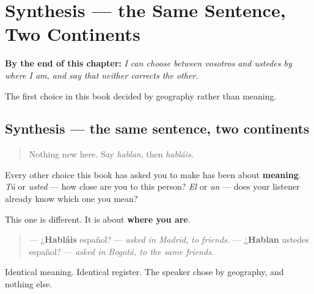 
\chapter{Synthesis --- the Same Sentence, Two Continents}
\label{ch:spanish-synthesis-plural-you}

\begin{chapteropening}
\textbf{By the end of this chapter:} \emph{I can choose between vosotros and ustedes by where I am, and say that neither corrects the other.}

The first choice in this book decided by geography rather than meaning.
\end{chapteropening}

\section[Practice]{Synthesis — the same sentence, two continents}

\label{lesson:ES-C07-sintesis-dos-continentes}



\begin{quote}
Nothing new here. Say \emph{hablan}, then \emph{habláis}.
\end{quote}

\begin{grammarlens}[title={Grammar Lens: a choice that is not about grammar}]
Every other choice this book has asked you to make has been about \textbf{meaning}. \emph{Tú} or \emph{usted} — how close are you to this person? \emph{El} or \emph{un} — does your listener already know which one you mean?

This one is different. It is about \textbf{where you are}.

\begin{quote}
— ¿\textbf{Habláis} español? — \emph{asked in Madrid, to friends.} — ¿\textbf{Hablan} ustedes español? — \emph{asked in Bogotá, to the same friends.}
\end{quote}

Identical meaning. Identical register. The speaker chose by geography, and nothing else.
\end{grammarlens}

